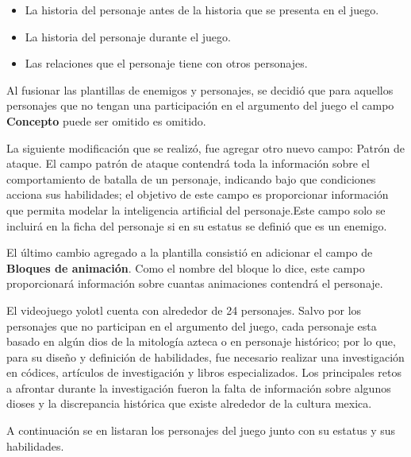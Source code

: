 	\begin{itemize}
		\item La historia del personaje antes de la historia que se presenta en el 
		juego.
		\item La historia del personaje durante el juego. 
		\item Las relaciones que el personaje tiene con otros personajes.
	\end{itemize}

	Al fusionar las plantillas de enemigos y personajes, se decidió que para aquellos 
	personajes que no tengan una participación en el argumento del juego el campo 
	\textbf{Concepto} puede ser omitido es omitido.
	\\
	\par
	La siguiente modificación que se realizó, fue agregar otro nuevo campo: Patrón 
	de ataque. El campo patrón de ataque contendrá toda la información sobre el 
	comportamiento de batalla de un personaje, indicando bajo que condiciones acciona 
	sus habilidades; el objetivo de este campo es proporcionar información que permita 
	modelar la inteligencia artificial del personaje.Este campo	solo se incluirá en la 
	ficha del personaje si en su estatus se definió que es un enemigo. 
	 \\
	 \par
	 El último cambio agregado a la plantilla consistió en adicionar el campo de \textbf{Bloques de animación}. Como el nombre del bloque lo dice, este campo 
	 proporcionará información sobre cuantas animaciones contendrá el personaje. 
	\\	 
	\par
	El videojuego yolotl cuenta con alrededor de 24 personajes. Salvo por los personajes 
	que no participan en el argumento del juego, cada personaje esta basado en algún 
	dios de la mitología azteca o en personaje histórico; por lo que, para su diseño y 
	definición de habilidades, fue necesario realizar una investigación en códices, 
	artículos de investigación y libros especializados. Los principales retos a 
	afrontar durante la investigación fueron la falta de información sobre algunos 
	dioses y la discrepancia histórica que existe alrededor de la cultura mexica. 
	\\
	\par
	A continuación se en listaran los personajes del juego junto con su estatus y sus 
	habilidades.
